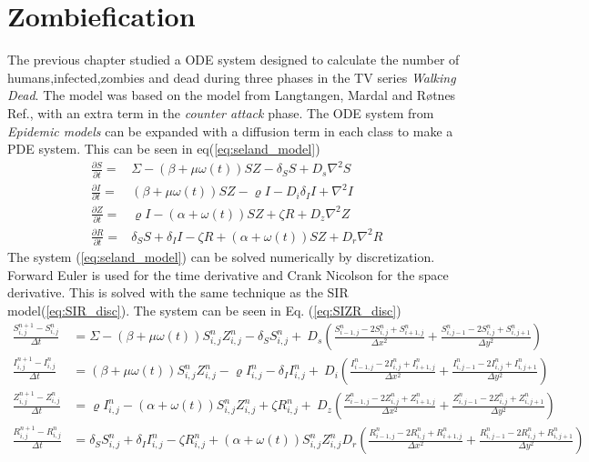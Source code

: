 \documentclass[%
twoside,                 %
final,                   %
10pt]{article}
\begin{document}
\section{Zombiefication}
The previous chapter studied a ODE system designed to calculate the number of humans,infected,zombies and dead during three phases in the TV series \emph{Walking Dead}. The model was based on the model from Langtangen, Mardal and Røtnes Ref.\cite{zombie-math}, with an extra term in the \emph{counter attack} phase. The ODE system from \emph{Epidemic models} can be expanded with a diffusion term in each class to make a PDE system. This can be seen in eq(\ref{eq:seland_model})  
\begin{equation} \label{eq:seland_model}
	\begin{aligned} 
	\frac{\partial S}{\partial t} =& \Sigma -(\beta+\mu \omega(t))SZ - \delta_SS +D_s\nabla^2 S \\
	\frac{\partial I}{\partial t} =& (\beta+\mu \omega(t))SZ - \varrho I - D_i\delta_II+\nabla^2 I\\
	\frac{\partial Z}{\partial t} =& \varrho I- (\alpha+\omega(t))SZ + \zeta R+D_z\nabla^2 Z\\
	\frac{\partial R}{\partial t} =& \delta_SS +\delta_II -\zeta R + (\alpha+\omega(t))SZ+D_r\nabla^2 R 
	\end{aligned}
\end{equation}
The system (\ref{eq:seland_model}) can be solved numerically by discretization. Forward Euler is used for the time derivative and Crank Nicolson for the space derivative. This is solved with the same technique as the SIR model(\ref{eq:SIR_disc}). The system can be seen in Eq. (\ref{eq:SIZR_disc})
\begin{equation} \label{eq:SIZR_disc}
	\begin{aligned}
    \frac{S^{n+1}_{i,j}-S^n_{i,j}}{\Delta t} &= \Sigma - (\beta+\mu \omega(t))S^{n}_{i,j}Z^{n}_{i,j}- \delta_S S^{n}_{i,j}+\
        D_s\left(\frac{S^{n}_{i-1,j}-2S^{n}_{i,j}+S^{n}_{i+1,j}}{\Delta x^2}+\frac{S^{n}_{i,j-1}-2S^{n}_{i,j}+S^{n}_{i,j+1}}{\Delta y^2}\right) \\
    \frac{I^{n+1}_{i,j}-I^n_{i,j}}{\Delta t} &= (\beta+\mu \omega(t))S^{n}_{i,j}Z^{n}_{i,j}-\varrho I^{n}_{i,j}- \delta_I I^{n}_{i,j}+\
        D_i\left(\frac{I^{n}_{i-1,j}-2I^{n}_{i,j}+I^{n}_{i+1,j}}{\Delta x^2}+\frac{I^{n}_{i,j-1}-2I^{n}_{i,j}+I^{n}_{i,j+1}}{\Delta y^2}\right) \\
    \frac{Z^{n+1}_{i,j}-Z^n_{i,j}}{\Delta t} &= \varrho I^{n}_{i,j}-(\alpha+\omega(t))S^{n}_{i,j}Z^{n}_{i,j}+ \zeta R^{n}_{i,j}+\
        D_z\left(\frac{Z^{n}_{i-1,j}-2Z^{n}_{i,j}+Z^{n}_{i+1,j}}{\Delta x^2}+\frac{Z^{n}_{i,j-1}-2Z^{n}_{i,j}+Z^{n}_{i,j+1}}{\Delta y^2}\right) \\
    \frac{R^{n+1}_{i,j}-R^n_{i,j}}{\Delta t} &= \delta_S S^{n}_{i,j}+\delta_I I^{n}_{i,j}-\zeta R^{n}_{i,j}+(\alpha+\omega(t))S^{n}_{i,j}Z^{n}_{i,j}
        D_r\left(\frac{R^{n}_{i-1,j}-2R^{n}_{i,j}+R^{n}_{i+1,j}}{\Delta x^2}+\frac{R^{n}_{i,j-1}-2R^{n}_{i,j}+R^{n}_{i,j+1}}{\Delta y^2}\right) 
	\end{aligned}
\end{equation}
\end{document}
